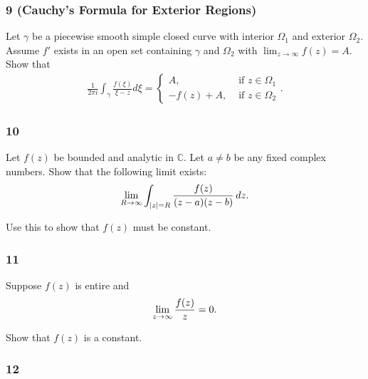 \hypertarget{cauchys-formula-for-exterior-regions}{%
\subsubsection{9 (Cauchy's Formula for Exterior
Regions)}\label{cauchys-formula-for-exterior-regions}}

Let \(\gamma\) be a piecewise smooth simple closed curve with interior
\(\Omega_1\) and exterior \(\Omega_2\). Assume \(f'\) exists in an open
set containing \(\gamma\) and \(\Omega_2\) with
\(\lim_{z\to \infty} f(z) = A\). Show that
\begin{align*}
\frac{1}{2 \pi i} \int_{\gamma} \frac{f(\xi)}{\xi-z} d \xi=\left\{\begin{array}{ll}
A, & \text { if } z \in \Omega_{1} \\
-f(z)+A, & \text { if } z \in \Omega_{2}
\end{array}\right.
.\end{align*}

\hypertarget{section-51}{%
\subsubsection{10}\label{section-51}}

Let \(f(z)\) be bounded and analytic in \({\mathbb{C}}\). Let
\(a\neq b\) be any fixed complex numbers. Show that the following limit
exists:
\begin{align*}
\lim_{R\to \infty} \int_{{\left\lvert {z} \right\rvert} = R} {f(z) \over (z-a)(z-b)} \,dz
.\end{align*}

Use this to show that \(f(z)\) must be constant.

\hypertarget{section-52}{%
\subsubsection{11}\label{section-52}}

Suppose \(f(z)\) is entire and
\begin{align*}
\lim_{z\to\infty} {f(z) \over z} = 0
.\end{align*}

Show that \(f(z)\) is a constant.

\hypertarget{section-53}{%
\subsubsection{12}\label{section-53}}

